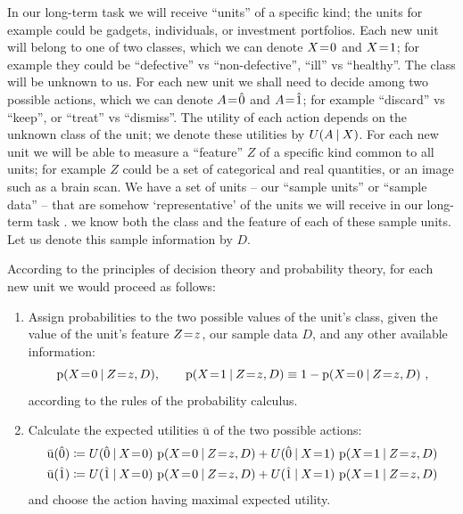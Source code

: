 \documentclass[\ifafour a4paper,12pt,\else a5paper,10pt,\fi%
onecolumn,oneside,article,%
british%
]{memoir}
\theoremstyle{remark}
\theoremstyle{innote}
\newcommand*{\defd}{\coloneqq}
\newcommand*{\p}{\mathrm{p}}%
\renewcommand*{\|}[1][]{\nonscript\:#1\vert\nonscript\:\mathopen{}}
\newcommand*{\mo}[1][=]{\mathrel{\mkern-3.5mu#1\mkern-3.5mu}}
\newcommand*{\za}{\hat{0}}
\newcommand*{\zb}{\hat{1}}
\newcommand*{\U}{\mathrm{u}}
\newcommand*{\eu}{\bar{\U}}
\begin{document}
In our long-term task we will receive \enquote{units} of a specific kind; the units for example could be gadgets, individuals, or investment portfolios. Each new unit will belong to one of two classes, which we can denote $X\mo 0$ and $X\mo 1$; for example they could be \enquote{defective} vs \enquote{non-defective}, \enquote{ill} vs \enquote{healthy}. The class will be unknown to us. For each new unit we shall need to decide among two possible actions, which we can denote $A\mo\za$ and $A\mo\zb$; for example \enquote{discard} vs \enquote{keep}, or \enquote{treat} vs \enquote{dismiss}. The utility of each action depends on the unknown class of the unit; we denote these utilities by $U(A \| X)$. For each new unit we will be able to measure a \enquote{feature} $Z$ of a specific kind common to all units; for example $Z$ could be a set of categorical and real quantities, or an image such as a brain scan. We have a set of units -- our \enquote{sample units} or \enquote{sample data} -- that are somehow \enquote*{representative} of the units we will receive in our long-term task \autocites[for a critical analysis of the sometimes hollow term \enquote{representative sample} see][]{kruskaletal1979,kruskaletal1979b,kruskaletal1979c,kruskaletal1980}. we know both the class and the feature of each of these sample units. Let us denote this sample information by $D$.

According to the principles of decision theory and probability theory, for each new unit we would proceed as follows:
\begin{enumerate}[label=\arabic*.]
\item Assign probabilities to the two possible values of the unit's class, given the value of the unit's feature $Z\mo z$, our sample data $D$, and any other available information:
  \begin{equation}
    \p(X\mo 0 \| Z\mo z, D), \qquad \p(X\mo 1 \| Z\mo z,D) \equiv 1- \p(X\mo 0 \| Z\mo z,D) \ ,
  \end{equation}
  according to the rules of the probability calculus.
\item Calculate the expected utilities $\eu$ of the two possible actions:
  \begin{equation}
    \begin{aligned}
      \eu(\za) &\defd U(\za \| X\mo 0) \ 
                 \p(X\mo 0 \| Z\mo z, D) + U(\za \| X\mo 1) \ 
                 \p(X\mo 1 \| Z\mo z, D)
      \\
      \eu(\zb) &\defd U(\zb \| X\mo 0) \ 
                 \p(X\mo 0 \| Z\mo z, D) + U(\zb \| X\mo 1) \ 
                 \p(X\mo 1 \| Z\mo z, D)
    \end{aligned}
\end{equation}
  and choose the action having maximal expected utility.
\end{enumerate}
\end{document}
